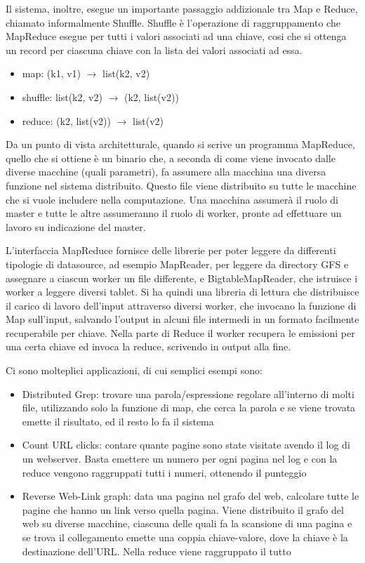 Il sistema, inoltre, esegue un importante passaggio addizionale tra Map e Reduce, chiamato informalmente Shuffle. Shuffle è l'operazione di raggruppamento che MapReduce esegue per tutti i valori associati ad una chiave, cosi che si ottenga un record per ciascuna chiave con la lista dei valori associati ad essa.

\begin{itemize}
    \item map: (k1, v1) $\rightarrow$ list(k2, v2)
    \item shuffle: list(k2, v2) $\rightarrow$ (k2, list(v2))
    \item reduce: (k2, list(v2)) $\rightarrow$ list(v2)
\end{itemize}

Da un punto di vista architetturale, quando si scrive un programma MapReduce, quello che si ottiene è un binario che, a seconda di come viene invocato dalle diverse macchine (quali parametri), fa assumere alla macchina una diversa funzione nel sistema distribuito. Questo file viene distribuito su tutte le macchine che si vuole includere nella computazione. Una macchina assumerà il ruolo di master e tutte le altre assumeranno il ruolo di worker, pronte ad effettuare un lavoro su indicazione del master.

L'interfaccia MapReduce fornisce delle librerie per poter leggere da differenti tipologie di datasource, ad esempio MapReader, per leggere da directory GFS e assegnare a ciascun worker un file differente, e BigtableMapReader, che istruisce i worker a leggere diversi tablet. Si ha quindi una libreria di lettura che distribuisce il carico di lavoro dell'input attraverso diversi worker, che invocano la funzione di Map sull'input, salvando l'output in alcuni file intermedi in un formato facilmente recuperabile per chiave. Nella parte di Reduce il worker recupera le emissioni per una certa chiave ed invoca la reduce, scrivendo in output alla fine.

Ci sono molteplici applicazioni, di cui semplici esempi sono: 

\begin{itemize}
    \item Distributed Grep: trovare una parola/espressione regolare all'interno di molti file, utilizzando solo la funzione di map, che cerca la parola e se viene trovata emette il risultato, ed il resto lo fa il sistema
    \item Count URL clicks: contare quante pagine sono state visitate avendo il log di un webserver. Basta emettere un numero per ogni pagina nel log e con la reduce vengono raggruppati tutti i numeri, ottenendo il punteggio
    \item Reverse Web-Link graph: data una pagina nel grafo del web, calcolare tutte le pagine che hanno un link verso quella pagina. Viene distribuito il grafo del web su diverse macchine, ciascuna delle quali fa la scansione di una pagina e se trova il collegamento emette una coppia chiave-valore, dove la chiave è la destinazione dell'URL. Nella reduce viene raggruppato il tutto
\end{itemize}

